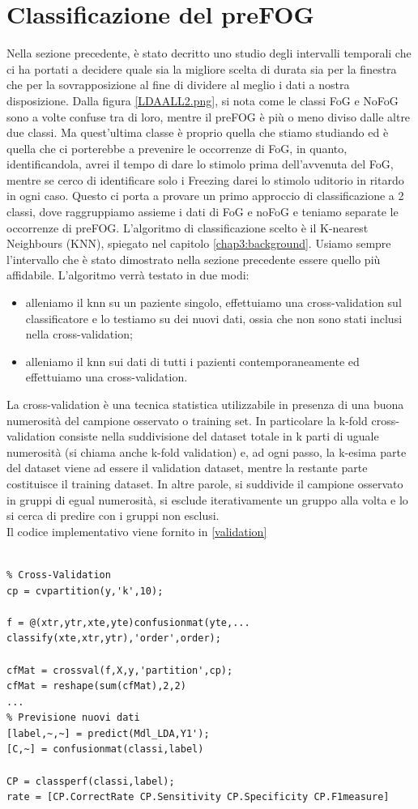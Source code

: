 \section{Classificazione del preFOG}
Nella sezione precedente, è stato decritto uno studio degli intervalli temporali che ci ha portati a decidere quale sia la migliore scelta di durata sia per la finestra che per la sovrapposizione al fine di dividere al meglio i dati a nostra disposizione. Dalla figura \ref{LDAALL2.png}, si nota come le classi FoG e NoFoG sono a volte confuse tra di loro, mentre il preFOG è più o meno diviso dalle altre due classi. Ma quest'ultima classe è proprio quella che stiamo studiando ed è quella che ci porterebbe a prevenire le occorrenze di FoG, in quanto, identificandola, avrei il tempo di dare lo stimolo prima dell'avvenuta del FoG, mentre se cerco di identificare solo i Freezing darei lo stimolo uditorio in ritardo in ogni caso. Questo ci porta a provare un primo approccio di classificazione a 2 classi, dove raggruppiamo assieme i dati di FoG e noFoG e teniamo separate le occorrenze di preFOG. L'algoritmo  di classificazione scelto è il K-nearest Neighbours (KNN), spiegato nel capitolo \ref{chap3:background}. Usiamo sempre l'intervallo che è stato dimostrato nella sezione precedente essere quello più affidabile. L'algoritmo verrà testato in due modi:
\begin{itemize}
	\item alleniamo il knn su un paziente singolo, effettuiamo una cross-validation sul classificatore e lo testiamo su dei nuovi dati, ossia che non sono stati inclusi nella  cross-validation;
	\item alleniamo il knn sui dati di tutti i pazienti contemporaneamente ed effettuiamo una cross-validation.
\end{itemize}
La cross-validation è una tecnica statistica utilizzabile in presenza di una buona numerosità del campione osservato o training set. In particolare la k-fold cross-validation consiste nella suddivisione del dataset totale in k parti di uguale numerosità (si chiama anche k-fold validation) e, ad ogni passo, la k-esima parte del dataset viene ad essere il validation dataset, mentre la restante parte costituisce il training dataset. In altre parole, si suddivide il campione osservato in gruppi di egual numerosità, si esclude iterativamente un gruppo alla volta e lo si cerca di predire con i gruppi non esclusi.\\
Il codice implementativo viene fornito in \ref{validation}

\begin{lstlisting}[style=Matlab-editor,frame=single, caption=Cross-Validation, label=validation]  % Start your code-block

% Cross-Validation
cp = cvpartition(y,'k',10);

f = @(xtr,ytr,xte,yte)confusionmat(yte,...
classify(xte,xtr,ytr),'order',order);

cfMat = crossval(f,X,y,'partition',cp);
cfMat = reshape(sum(cfMat),2,2)
...
% Previsione nuovi dati
[label,~,~] = predict(Mdl_LDA,Y1');
[C,~] = confusionmat(classi,label)

CP = classperf(classi,label);
rate = [CP.CorrectRate CP.Sensitivity CP.Specificity CP.F1measure]
\end{lstlisting}